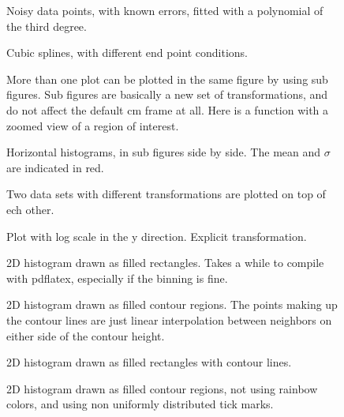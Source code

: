 \documentclass{article}
\begin{document}
\begin{figure}[H]
\centering

\caption{Noisy data points, with known errors, fitted with a polynomial of the third degree.}
\end{figure}
\begin{figure}[H]
\centering

\caption{Cubic splines, with different end point conditions.}
\end{figure}
\begin{figure}[H]
\centering

\caption{More than one plot can be plotted in the same figure by using sub figures.
Sub figures are basically a new set of transformations, and do not affect the default cm frame at all.
Here is a function with a zoomed view of a region of interest.}
\end{figure}
\begin{figure}[H]
\centering

\caption{Horizontal histograms, in sub figures side by side. The mean and $\sigma$ are indicated in red.}
\end{figure}
\begin{figure}[H]
\centering

\caption{Two data sets with different transformations are plotted on top of ech other.}
\end{figure}
\begin{figure}[H]
\centering

\caption{Plot with log scale in the y direction. Explicit transformation.}
\end{figure}
\begin{figure}[H]
\centering

\caption{2D histogram drawn as filled rectangles. Takes a while to compile with pdflatex, 
especially if the binning is fine.}
\end{figure}
\begin{figure}[H]
\centering

\caption{2D histogram drawn as filled contour regions. The points making up the contour lines 
are just linear interpolation between neighbors on either side of the contour height.}
\end{figure}
\begin{figure}[H]
\centering

\caption{2D histogram drawn as filled rectangles with contour lines.}
\end{figure}
\begin{figure}[H]
\centering

\caption{2D histogram drawn as filled contour regions, not using rainbow colors, and using
non uniformly distributed tick marks.}
\end{figure}
\end{document}
